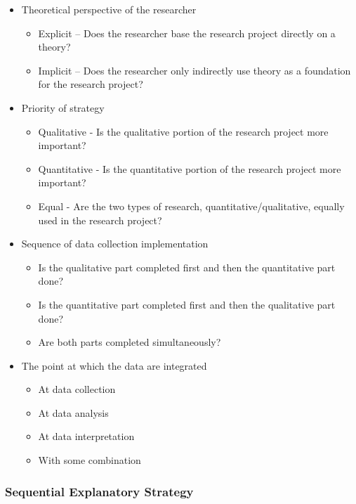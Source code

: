 \begin{itemize}
	\item Theoretical perspective of the researcher
	\begin{itemize}
		\item Explicit – Does the researcher base the research project directly on a theory?
		\item Implicit – Does the researcher only indirectly use theory as a foundation for the research project?
	\end{itemize}

	\item Priority of strategy
	\begin{itemize}
		\item Qualitative - Is the qualitative portion of the research project more important?
		\item Quantitative - Is the quantitative portion of the research project more important?
		\item Equal - Are the two types of research, quantitative/qualitative, equally used in the research project?
	\end{itemize}

	\item Sequence of data collection implementation
	\begin{itemize}
		\item Is the qualitative part completed first and then the quantitative part done?
		\item Is the quantitative part completed first and then the qualitative part done?
		\item Are both parts completed simultaneously?
	\end{itemize}

	\item The point at which the data are integrated
	\begin{itemize}
		\item At data collection
		\item At data analysis
		\item At data interpretation
		\item With some combination
	\end{itemize}
\end{itemize}

\subsubsection{Sequential Explanatory Strategy}

